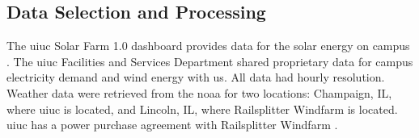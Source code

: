 \subsection{Data Selection and Processing}

The \gls{uiuc} Solar Farm 1.0 dashboard provides data for the solar energy on
campus \cite{alsoenergy_university_2019}. The \gls{uiuc} Facilities and
Services Department shared proprietary data for campus electricity demand and
wind energy with us. All data had hourly resolution. Weather data were
retrieved from the
\gls{noaa}\cite{national_center_for_environmental_information_find_nodate} for
two locations: Champaign, IL, where \gls{uiuc} is located, and Lincoln, IL,
where Railsplitter Windfarm is located. \gls{uiuc} has a power purchase
agreement with Railsplitter Windfarm \cite{breitweiser_wind_2016}.

